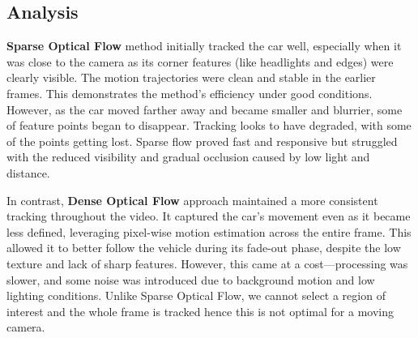 \documentclass[12pt,a4paper]{article}
\begin{document}
\subsection{Analysis}
\textbf{Sparse Optical Flow} method initially tracked the car well, especially when it was close to the camera as its corner features (like headlights and edges) were 
clearly visible. The motion trajectories were clean and stable in the earlier frames. This demonstrates the method's efficiency under good conditions. 
However, as the car moved farther away and became smaller and blurrier, some of feature points began to disappear. Tracking looks to have degraded, 
with some of the points getting lost. Sparse flow proved fast and responsive but struggled with the reduced visibility and gradual occlusion caused 
by low light and distance.

In contrast, \textbf{Dense Optical Flow} approach maintained a more consistent tracking throughout the video. It captured the car's movement 
even as it became less defined, leveraging pixel-wise motion estimation across the entire frame. This allowed it to better follow the vehicle 
during its fade-out phase, despite the low texture and lack of sharp features. However, this came at a cost—processing was slower, 
and some noise was introduced due to background motion and low lighting conditions. Unlike Sparse Optical Flow, we cannot select a region of interest and 
the whole frame is tracked hence this is not optimal for a moving camera.
\end{document}
